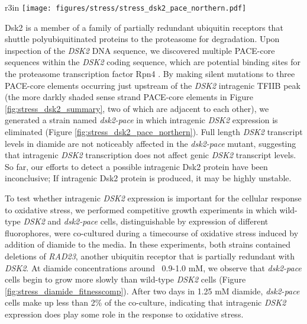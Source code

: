 \begin{wrapfigure}[10]{r}{3in}
    \centering
    \texttt{[image: figures/stress/stress\_dsk2\_pace\_northern.pdf]}
    \caption[Northern blot for \textit{DSK2} transcripts in wild-type \textit{DSK2} and \textit{dsk2-pace} strains, in the absence or presence of oxidative stress.]{Northern blot for \textit{DSK2} transcripts in wild-type \textit{DSK2} and \textit{dsk2-pace} strains, in the absence or presence of oxidative stress induced by addition of diamide to the media.}
    \label{fig:stress_dsk2_pace_northern}
\end{wrapfigure}

Dsk2 is a member of a family of partially redundant ubiquitin receptors that shuttle polyubiquitinated proteins to the proteasome for degradation.
Upon inspection of the \textit{DSK2} DNA sequence, we discovered multiple PACE-core sequences within the \textit{DSK2} coding sequence, which are potential binding sites for the proteasome transcription factor Rpn4 \citep{shirozu2015}.
By making silent mutations to three PACE-core elements occurring just upstream of the \textit{DSK2} intragenic TFIIB peak (the more darkly shaded sense strand PACE-core elements in Figure \ref{fig:stress_dsk2_summary}, two of which are adjacent to each other), we generated a strain named \textit{dsk2-pace} in which intragenic \textit{DSK2} expression is eliminated (Figure \ref{fig:stress_dsk2_pace_northern}).
Full length \textit{DSK2} transcript levels in diamide are not noticeably affected in the \textit{dsk2-pace} mutant, suggesting that intragenic \textit{DSK2} transcription does not affect genic \textit{DSK2} transcript levels.
So far, our efforts to detect a possible intragenic Dsk2 protein have been inconclusive; If intragenic Dsk2 protein is produced, it may be highly unstable.

To test whether intragenic \textit{DSK2} expression is important for the cellular response to oxidative stress, we performed competitive growth experiments in which wild-type \textit{DSK2} and \textit{dsk2-pace} cells, distinguishable by expression of different fluorophores, were co-cultured during a timecourse of oxidative stress induced by addition of diamide to the media.
In these experiments, both strains contained deletions of \textit{RAD23}, another ubiquitin receptor that is partially redundant with \textit{DSK2}.
At diamide concentrations around ~0.9-1.0 mM, we observe that \textit{dsk2-pace} cells begin to grow more slowly than wild-type \textit{DSK2} cells (Figure \ref{fig:stress_diamide_fitnesscomp}).
After two days in 1.25 mM diamide, \textit{dsk2-pace} cells make up less than 2\% of the co-culture, indicating that intragenic \textit{DSK2} expression does play some role in the response to oxidative stress.

